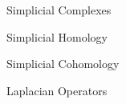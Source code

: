 \documentclass[../main.tex]{subfiles}
\begin{document}
    \begin{section}{Simplicial Complexes} 
            
    \end{section}
    \newpage
    \begin{section}{Simplicial Homology}
            
    \end{section}
    \newpage
    \begin{section}{Simplicial Cohomology}
         
    \end{section}
    \newpage
    \begin{section}{Laplacian Operators}
        
    \end{section}
\end{document}
